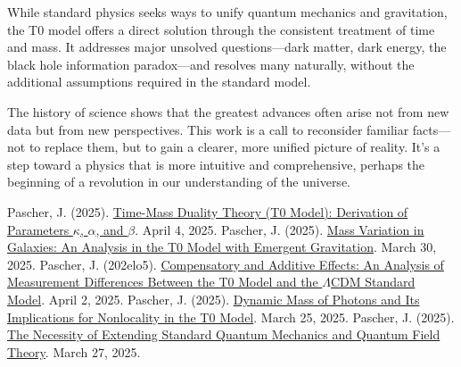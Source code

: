 \documentclass[a4paper,12pt]{article}
\begin{document}
	While standard physics seeks ways to unify quantum mechanics and gravitation, the T0 model offers a direct solution through the consistent treatment of time and mass. It addresses major unsolved questions—dark matter, dark energy, the black hole information paradox—and resolves many naturally, without the additional assumptions required in the standard model.
	
	The history of science shows that the greatest advances often arise not from new data but from new perspectives. This work is a call to reconsider familiar facts—not to replace them, but to gain a clearer, more unified picture of reality. It’s a step toward a physics that is more intuitive and comprehensive, perhaps the beginning of a revolution in our understanding of the universe.
	
	\begin{thebibliography}{99}
		 Pascher, J. (2025). \href{https://github.com/jpascher/T0-Time-Mass-Duality/tree/main/2/pdf/English/Zeit-Masse-Dualitätstheorie (T0-Modell) Herleitung der Parameter kappa, alpha und beta_en.pdf}{Time-Mass Duality Theory (T0 Model): Derivation of Parameters \(\kappa\), \(\alpha\), and \(\beta\)}. April 4, 2025.
		 Pascher, J. (2025). \href{https://github.com/jpascher/T0-Time-Mass-Duality/tree/main/2/pdf/English/Massenvariation in Galaxien_en.pdf}{Mass Variation in Galaxies: An Analysis in the T0 Model with Emergent Gravitation}. March 30, 2025.
		 Pascher, J. (202elo5). \href{https://github.com/jpascher/T0-Time-Mass-Duality/tree/main/2/pdf/English/Analyse der Messdifferenzen zwischen dem T0-Modell und dem Standardmodell_en.pdf}{Compensatory and Additive Effects: An Analysis of Measurement Differences Between the T0 Model and the \(\Lambda\)CDM Standard Model}. April 2, 2025.
		 Pascher, J. (2025). \href{https://github.com/jpascher/T0-Time-Mass-Duality/tree/main/2/pdf/English/Dynamische Masse von Photonen und ihre Implikationen für Nichtlokalität_en.tex}{Dynamic Mass of Photons and Its Implications for Nonlocality in the T0 Model}. March 25, 2025.
		 Pascher, J. (2025). \href{https://github.com/jpascher/T0-Time-Mass-Duality/tree/main/2/pdf/English/Die Notwendigkeit einer Erweiterung der Standard-Quantenmechanik und Quantenfeldtheorie_en.pdf}{The Necessity of Extending Standard Quantum Mechanics and Quantum Field Theory}. March 27, 2025.
	\end{thebibliography}
	
\end{document}
